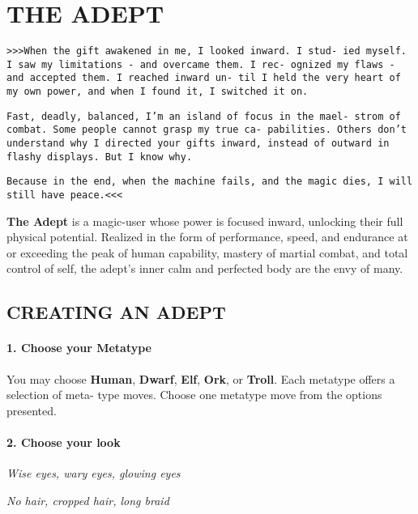 
\section{THE ADEPT}
\begin{multicols}{3}
\setlength{\parskip}{.05cm}

\texttt{>>>When the gift awakened in me, I looked inward. I stud-
ied myself. I saw my limitations - and overcame them. I rec-
ognized my flaws - and accepted them. I reached inward un-
til I held the very heart of my own power, and when I found
it, I switched it on.}

\texttt{Fast, deadly, balanced, I’m an island of focus in the mael-
strom of combat. Some people cannot grasp my true ca-
pabilities. Others don’t understand why I directed your gifts
inward, instead of outward in flashy displays. But
I know why.}

\texttt{Because in the end, when the machine fails, and the magic
dies, I will still have peace.<<<}

\textbf{The Adept} is a magic-user whose power is focused
inward, unlocking their full physical potential. Realized
in the form of performance, speed, and endurance at
or exceeding the peak of human capability, mastery
of martial combat, and total control of self, the adept’s
inner calm and perfected body are the envy of
many.

\subsection{CREATING AN ADEPT}

\paragraph{1.  Choose your Metatype}

You may choose \textbf{Human}, \textbf{Dwarf}, \textbf{Elf}, \textbf{Ork}, or
\textbf{Troll}. Each metatype offers a selection of meta-
type moves. Choose one metatype move from
the options presented.

\paragraph{2.  Choose your look}

\textit{Wise eyes, wary eyes, glowing eyes}

\textit{No hair, cropped hair, long braid}


\end{multicols}
